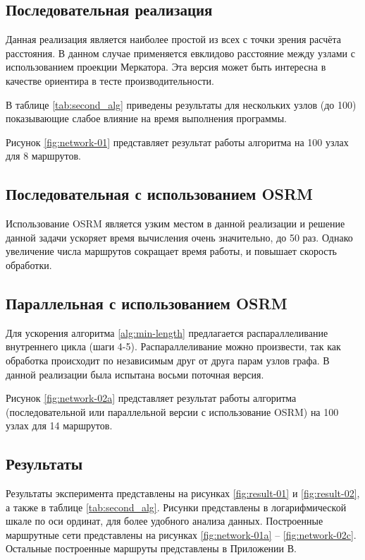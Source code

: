 \subsection{Последовательная реализация}
Данная реализация является наиболее простой из всех с точки зрения расчёта расстояния. В данном случае 
применяется евклидово расстояние между узлами с использованием проекции Меркатора. Эта версия может быть 
интересна в качестве ориентира в тесте производительности.

В таблице \ref{tab:second_alg} приведены результаты для нескольких узлов (до 100) показывающие слабое влияние 
на время выполнения программы.

Рисунок \ref{fig:network-01} представляет результат работы алгоритма на 100 узлах для 8 маршрутов.

\subsection{Последовательная с использованием OSRM}
Использование OSRM является узким местом в данной реализации и решение данной задачи ускоряет время 
вычисления очень значительно, до 50 раз. Однако увеличение числа маршрутов сокращает время работы, и повышает 
скорость обработки.

\subsection{Параллельная с использованием OSRM}
Для ускорения алгоритма \ref{alg:min-length} предлагается распараллеливание внутреннего цикла (шаги 4-5).
Распараллеливание можно произвести, так как обработка происходит по независимым друг от друга парам узлов 
графа. В данной реализации была испытана восьми поточная версия.

Рисунок \ref{fig:network-02a} представляет результат работы алгоритма (последовательной или параллельной 
версии с использование OSRM) на 100 узлах для 14 маршрутов.

\subsection{Результаты}
Результаты эксперимента представлены на рисунках \ref{fig:result-01} и \ref{fig:result-02}, а также в таблице 
\ref{tab:second_alg}. Рисунки представлены в логарифмической шкале по оси ординат, для более удобного анализа 
данных. Построенные маршрутные сети представлены на рисунках \ref{fig:network-01a} -- \ref{fig:network-02c}. 
Остальные построенные маршруты представлены в Приложении В.

